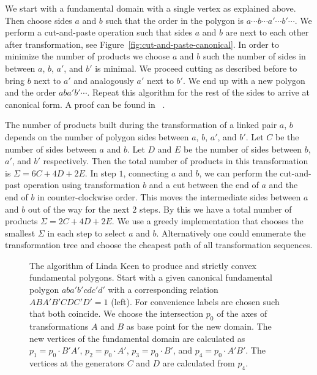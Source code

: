 \documentclass[Thesis]{subfiles}
\begin{document}
We start with a fundamental domain with a single vertex as explained above. Then choose sides $a$ and $b$ such that the order in the polygon is $a\cdots b \cdots a' \cdots b' \cdots$. We perform a cut-and-paste operation such that sides $a$ and $b$ are next to each other after transformation, see Figure~\ref{fig:cut-and-paste-canonical}. In order to minimize the number of products we choose $a$ and $b$ such the number of sides in between $a$, $b$, $a'$, and $b'$ is minimal. We proceed cutting as described before to bring $b$ next to $a'$ and analogously $a'$ next to $b'$. We end up with a new polygon and the order $aba'b'\cdots$. Repeat this algorithm for the rest of the sides to arrive at canonical form. A proof can be found in ~\cite{Jost2007}.

The number of products built during the transformation of a linked pair $a$, $b$ depends on the number of polygon sides between $a$, $b$, $a'$, and $b'$. Let $C$ be the number of sides between $a$ and $b$. Let $D$ and $E$ be the number of sides between $b$, $a'$, and $b'$ respectively. Then the total number of products in this transformation is $\Sigma=6C+4D+2E$. In step $1$, connecting $a$ and $b$, we can perform the cut-and-past operation using transformation $b$ and a cut between the end of $a$ and the end of $b$ in counter-clockwise order. This moves the intermediate sides between $a$ and $b$ out of the way for the next $2$ steps. By this we have a total number of products $\Sigma=2C+4D+2E$. We use a greedy implementation that chooses the smallest $\Sigma$ in each step to select $a$ and $b$. Alternatively one could enumerate the transformation tree and choose the cheapest path of all transformation sequences.

\begin{figure}
\centering
{}
\caption{The algorithm of Linda Keen to produce and strictly convex fundamental polygons. Start with a given canonical fundamental polygon $aba'b'cdc'd'$ with a corresponding relation $ABA'B'CDC'D'=1$ (left). For convenience labels are chosen such that both coincide. We choose the intersection $p_0$ of the axes of transformations $A$ and $B$ as base point for the new domain. The new vertices of the fundamental domain are calculated as $p_1=p_0\cdot B'A'$, $p_2=p_0\cdot A'$, $p_3=p_0\cdot B'$, and $p_4=p_0\cdot A'B'$. The vertices at the generators $C$ and $D$ are calculated from $p_4$.}
\label{fig:keen_polygon}
\end{figure}
\end{document}
